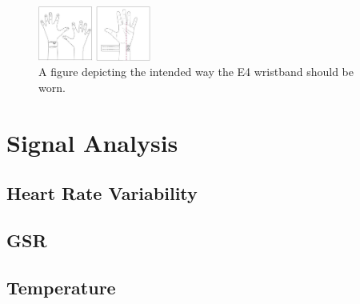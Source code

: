 \begin{figure}[ht]
	\centering
  \includegraphics[width=0.33\textwidth]{../images/E4wearing.JPG}
	\caption{A figure depicting the intended way the E4 wristband should be worn.}
	\label{e4wearing}
\end{figure}

\section{Signal Analysis}




\subsection{Heart Rate Variability}

\subsection{GSR}

\subsection{Temperature}
